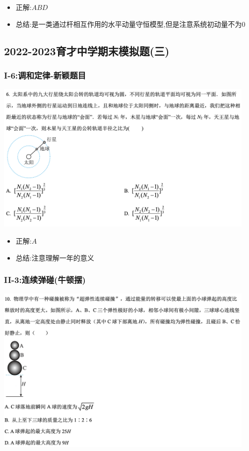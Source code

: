 \documentclass{article}
\begin{document}
\begin{itemize}
    \item 正解:\quad $ABD$
    \item 总结:\quad 是一类通过杆相互作用的水平动量守恒模型,但是注意系统初动量不为0
\end{itemize}

\vspace{2em}

\subsection{2022-2023育才中学期末模拟题(三)}
\subsubsection{I-6:调和定律-新颖题目}

\includegraphics[width=0.95\textwidth,keepaspectratio]{./pictures/1.5-2.png}

\begin{itemize}
    \item 正解:\quad $A$
    \item 总结:\quad 注意理解一年的意义
\end{itemize}

\subsubsection{II-3:连续弹碰(牛顿摆)}

\includegraphics[width=0.95\textwidth,keepaspectratio]{./pictures/1.5-3.png}
\end{document}

